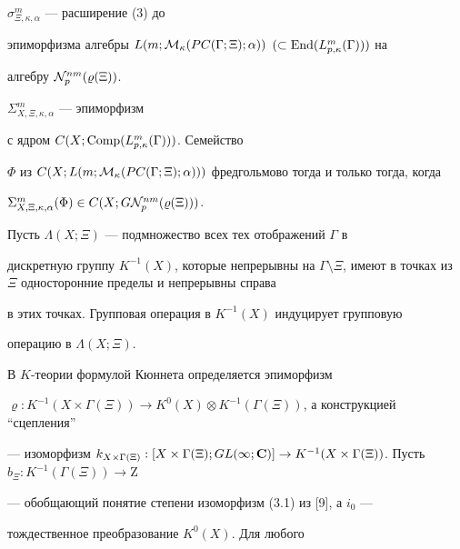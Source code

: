 $\sigma_{\Xi ,\kappa,\alpha}^m$ --- расширение (3) до


эпиморфизма алгебры $L(m;{\cal M}_\kappa (PC(\Gamma ;\Xi);


\alpha))$ $(\subset \End(L_{p, \kappa }^m(\Gamma)))$ на


алгебру ${\cal N}_p^{nm}(\varrho(\Xi))$.





\begin{thm}


$\Sigma_{X,\Xi,\kappa,\alpha}^m$ --- эпиморфизм


с ядром $C(X;\operatorname{Comp}(L_{p,\kappa}^m(\Gamma)))$. Семейство


$\Phi$ из $C(X;L(m;\linebreak{\cal M}_\kappa (PC(\Gamma ;\Xi);


\alpha)))$ фредгольмово тогда и только тогда, когда


$\Sigma_{X,\Xi,\kappa,\alpha}^m(\Phi)


\in C(X;G{\cal N}_p^{nm}(\varrho (\Xi)))$.


\end{thm}





Пусть $\Lambda (X;\Xi)$ --- подмножество всех тех отображений $\Gamma$ в


дискретную группу $K^{-1}(X)$, которые непрерывны на $\Gamma \setminus


\Xi$, имеют в точках из $\Xi$ односторонние пределы и непрерывны справа


в этих точках. Групповая операция в $K^{-1}(X)$ индуцирует групповую


операцию в $\Lambda (X;\Xi)$.


В $K$-теории формулой Кюннета определяется эпиморфизм


$\varrho :K^{-1}(X\times\Gamma (\Xi))\to K^0(X)


\otimes K^{-1}(\Gamma (\Xi))$, а конструкцией ``сцепления''


--- изоморфизм $k_{X\times\Gamma (\Xi)}:


[X\times\Gamma (\Xi); GL(\infty ;{\bold C})]\to K^{-1}


(X\times\Gamma (\Xi))$. Пусть $b_\Xi :K^{-1}(\Gamma (\Xi))\to \mathrm Z$


--- обобщающий понятие степени изоморфизм (3.1) из [9], а $i_0$ ---


тождественное преобразование $K^0(X)$. Для любого


